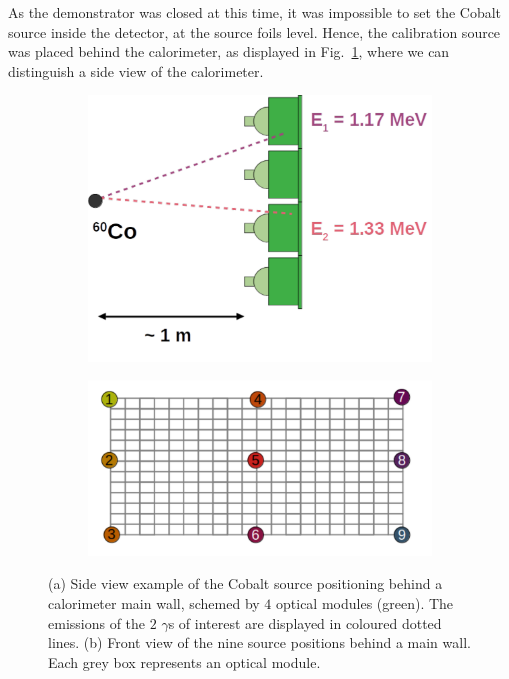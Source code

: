 As the demonstrator was closed at this time, it was impossible to set the Cobalt source inside the detector, at the source foils level.
Hence, the calibration source was placed behind the calorimeter, as displayed in Fig.~\ref{subfig:Co_setup}, where we can distinguish a side view of the calorimeter.
\begin{figure}[h]
  \centering
  \begin{subfigure}[t]{0.48\textwidth}
    \centering
    \includegraphics[height=0.5\textwidth]{commissioning/fig_commissioning/Co_setup.pdf}
    \captionsetup{justification=justified}
    \caption{
      \label{subfig:Co_setup}}
  \end{subfigure}
  \hfill
  \begin{subfigure}[t]{0.48\textwidth}
    \centering
    \includegraphics[height=0.5\textwidth]{commissioning/fig_commissioning/Co_setup_wall.pdf}
    \captionsetup{justification=justified}
    \caption{
      \label{subfig:Co_setup_wall}}
  \end{subfigure}
  \caption{(a) Side view example of the Cobalt source positioning behind a calorimeter main wall, schemed by $4$ optical modules (green).
    The emissions of the $2$ $\gamma$s of interest are displayed in coloured dotted lines.
    (b) Front view of the nine source positions behind a main wall.
    Each grey box represents an optical module.
  }
\end{figure}

